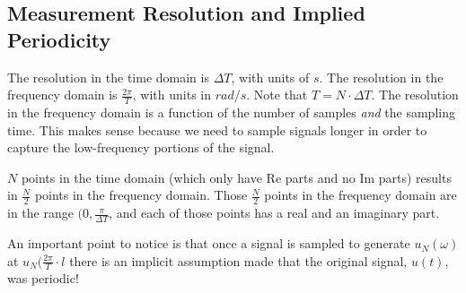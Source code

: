 \documentclass[lecture,12pt,]{pcms-l}
\newcommand{\w}{\omega}
\begin{document}
\subsection{Measurement Resolution and Implied Periodicity}
The resolution in the time domain is $\Delta T$, with units of $s$. The resolution in the frequency domain is $\frac{2\pi}{T}$, with units in $rad/s$. Note that $T=N\cdot\Delta T$. The resolution in the frequency domain is a function of the number of samples \textit{and} the sampling time. This makes sense because  we need to sample signals longer in order to capture the low-frequency portions of the signal.

$N$ points in the time domain (which only have $\text{Re}$ parts and no $\text{Im}$ parts) results in $\frac{N}{2}$ points in the frequency domain. Those $\frac{N}{2}$ points in the frequency domain are in the range $(0,\frac{\pi}{\Delta T}$, and each of those points has a real and an imaginary part.

An important point to notice is that once a signal is sampled to generate $u_N(\w)$ at $u_N(\frac{2\pi}{T}\cdot l$ there is an implicit assumption made that the original signal, $u(t)$, was periodic!
\end{document}
